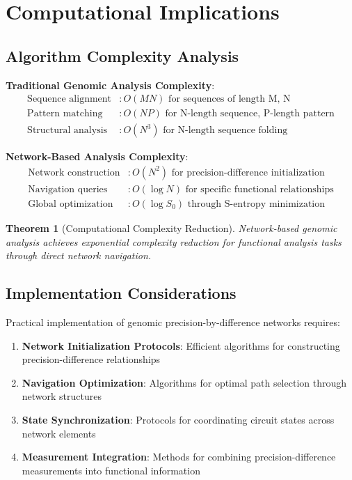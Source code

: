 \documentclass[12pt,a4paper]{article}
\newtheorem{theorem}{Theorem}
\begin{document}
\section{Computational Implications}

\subsection{Algorithm Complexity Analysis}

\textbf{Traditional Genomic Analysis Complexity}:
\begin{align}
\text{Sequence alignment} &: O(MN) \text{ for sequences of length M, N} \\
\text{Pattern matching} &: O(NP) \text{ for N-length sequence, P-length pattern} \\
\text{Structural analysis} &: O(N^3) \text{ for N-length sequence folding}
\end{align}

\textbf{Network-Based Analysis Complexity}:
\begin{align}
\text{Network construction} &: O(N^2) \text{ for precision-difference initialization} \\
\text{Navigation queries} &: O(\log N) \text{ for specific functional relationships} \\
\text{Global optimization} &: O(\log S_0) \text{ through S-entropy minimization}
\end{align}

\begin{theorem}[Computational Complexity Reduction]
Network-based genomic analysis achieves exponential complexity reduction for functional analysis tasks through direct network navigation.
\end{theorem}

\subsection{Implementation Considerations}

Practical implementation of genomic precision-by-difference networks requires:

\begin{enumerate}
\item \textbf{Network Initialization Protocols}: Efficient algorithms for constructing precision-difference relationships
\item \textbf{Navigation Optimization}: Algorithms for optimal path selection through network structures  
\item \textbf{State Synchronization}: Protocols for coordinating circuit states across network elements
\item \textbf{Measurement Integration}: Methods for combining precision-difference measurements into functional information
\end{enumerate}
\end{document}
